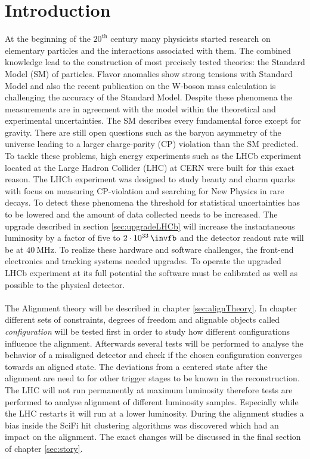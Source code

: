 \chapter{Introduction}
\label{sec:einleitung}

At the beginning of the $20^{\text{th}}$ century many physicists started research on
elementary particles and the interactions associated with them. The combined
knowledge lead to the construction of most precisely tested theories: the
Standard Model (SM) of particles.
Flavor anomalies show strong tensions with Standard Model and also the recent publication on the W-boson mass calculation is challenging the accuracy of the Standard Model. Despite these phenomena the measurements are in agreement
with the model within the theoretical and experimental uncertainties.
The SM describes every fundamental force except for gravity. There are still open
questions such as the baryon asymmetry of the universe leading to a larger
charge-parity (CP) violation than the SM predicted.
To tackle these problems, high energy experiments such as the LHCb experiment located at the Large Hadron Collider (LHC) at CERN were built for this exact reason.
The LHCb experiment was designed to study beauty and charm quarks with focus on measuring CP-violation and searching for New Physics in rare decays.
To detect these phenomena the threshold for statistical uncertainties has to
be lowered and the amount of data collected needs to be increased. The upgrade
described in section \ref{sec:upgradeLHCb} will increase the instantaneous
luminosity by a factor of five to $\SI{2e33}{\invfb}$ and
the detector readout rate will be at $\SI{40}{\mega\hertz}$. To realize these
hardware and software challenges, the front-end electronics and tracking systems needed upgrades.
To operate the upgraded LHCb experiment at its full potential the software must be
calibrated as well as possible to the physical detector.
\\
\\
The Alignment theory will be described in chapter \ref{sec:alignTheory}.
In chapter \label{sec:story} different sets of constraints, degrees of freedom
and alignable objects called \textit{configuration} will be tested first in order
to study how different configurations influence the alignment. Afterwards several
tests will be performed to analyse the behavior of a misaligned detector and check
if the chosen configuration converges towards an aligned state.
The deviations from a centered state after the alignment are need to for other trigger stages to be known in the reconstruction.
The LHC will not run permanently at maximum luminosity therefore tests are performed to analyse alignment of different luminosity samples. Especially while the LHC restarts it will run at a lower luminosity.
During the alignment studies a bias inside the SciFi hit clustering algorithms was discovered which had an impact on the alignment. The exact changes will be discussed in the final section of chapter \ref{sec:story}.
